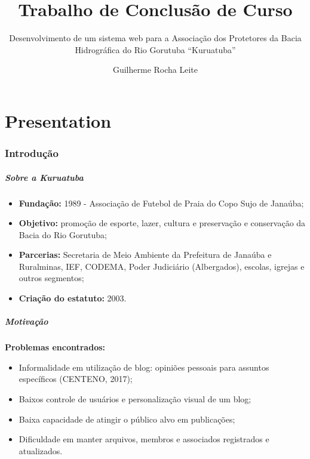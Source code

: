 \documentclass[xcolor=table]{beamer}
\title[Trabalho de Conclusão de Curso]{Trabalho de Conclusão de Curso}
\subtitle{Desenvolvimento de um sistema web para a Associação dos Protetores da Bacia Hidrográfica do Rio Gorutuba ``Kuruatuba''}
\author[Guilherme Rocha Leite]{Guilherme Rocha Leite}
\institute[UFVJM]{Universidade Federal dos Vales do Jequitinhonha e Mucuri \newline
  Bacharelado em Sistemas de Informação \newline
	  
     Orientador: Prof. Erinaldo Barbosa da Silva\\
     Coorientador: Thales Francisco Mota Carvalho\\
     $~$\\
}
\begin{document}
\frame{\titlepage}

\part{Presentation}




\section{Introdução}

\begin{frame}
    \frametitle{Sobre a Kuruatuba}
    \begin{itemize}
        \item \textbf{Fundação:} 1989 - Associação de Futebol de Praia do Copo Sujo de Janaúba;
        \item \textbf{Objetivo:} promoção de esporte, lazer, cultura e preservação e conservação da Bacia do Rio Gorutuba;
        \item \textbf{Parcerias:} Secretaria de Meio Ambiente da Prefeitura de Janaúba e Ruralminas, IEF, CODEMA, Poder Judiciário (Albergados), escolas, igrejas e outros segmentos;
        \item \textbf{Criação do estatuto:} 2003.
    \end{itemize}

\end{frame}


\begin{frame}
    \frametitle{Motivação}
    
    \textbf{Problemas encontrados:}
    \begin{itemize}
        \item Informalidade em utilização de blog: opiniões pessoais para assuntos específicos (CENTENO, 2017);
        \item Baixos controle de usuários e personalização visual de um blog; %
        \item Baixa capacidade de atingir o público alvo em publicações; %
        \item Dificuldade em manter arquivos, membros e associados registrados e atualizados.
    \end{itemize}

\end{frame}
\end{document}
